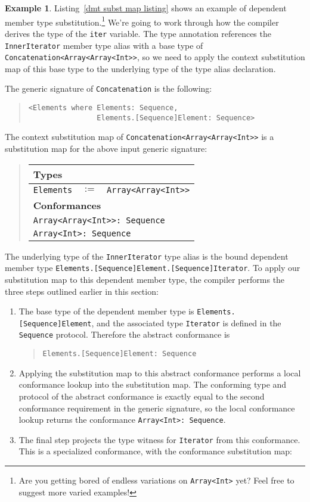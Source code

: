 \documentclass[a4paper,headsepline,bibliography=totoc,toc=flat,fleqn,twoside=semi]{scrbook}
\theoremstyle{definition}
\theoremstyle{definition}
\newtheorem{example}{Example}[chapter]
\theoremstyle{definition}
\newcommand{\SubMapC}[2]{\begin{tabular}{|lll|}
\hline
\multicolumn{3}{|l|}{\textbf{Types}}\\
\hline
#1\\
\hline
\hline
\multicolumn{3}{|l|}{\textbf{Conformances}}\\
\hline
#2\\
\hline
\end{tabular}}
\newcommand{\SubType}[2]{\texttt{#1}&$:=$&\texttt{#2}}
\newcommand{\SubConf}[1]{\multicolumn{3}{|l|}{\texttt{#1}}}
\begin{document}
\begin{example}
Listing~\ref{dmt subst map listing} shows an example of dependent member type substitution.\footnote{Are you getting bored of endless variations on \texttt{Array<Int>} yet? Feel free to suggest more varied examples!} We're going to work through how the compiler derives the type of the \texttt{iter} variable.
The type annotation references the \texttt{InnerIterator} member type alias with a base type of \texttt{Concatenation<Array<Array<Int>>}, so we need to apply the context substitution map of this base type to the underlying type of the type alias declaration.

The generic signature of \texttt{Concatenation} is the following:
\begin{quote}
\begin{verbatim}
<Elements where Elements: Sequence,
                Elements.[Sequence]Element: Sequence>
\end{verbatim}
\end{quote}
The context substitution map of \texttt{Concatenation<Array<Array<Int>>} is a substitution map for the above input generic signature:
\begin{quote}
\SubMapC{
\SubType{Elements}{Array<Array<Int>>}
}{
\SubConf{Array<Array<Int>>:\ Sequence}\\
\SubConf{Array<Int>:\ Sequence}
}
\end{quote}
The underlying type of the \texttt{InnerIterator} type alias is the bound dependent member type \verb|Elements.[Sequence]Element.[Sequence]Iterator|. To apply our substitution map to this dependent member type, the compiler performs the three steps outlined earlier in this section:
\begin{enumerate}
\item The base type of the dependent member type is \verb|Elements.[Sequence]Element|, and the associated type \texttt{Iterator} is defined in the \texttt{Sequence} protocol. Therefore the abstract conformance is
\begin{quote}
\verb|Elements.[Sequence]Element: Sequence|
\end{quote}
\item Applying the substitution map to this abstract conformance performs a local conformance lookup into the substitution map. The conforming type and protocol of the abstract conformance is exactly equal to the second conformance requirement in the generic signature, so the local conformance lookup returns the conformance \verb|Array<Int>: Sequence|.
\item The final step projects the type witness for \texttt{Iterator} from this conformance. This is a specialized conformance, with the conformance substitution map:

\end{enumerate}
\end{example}
\end{document}
